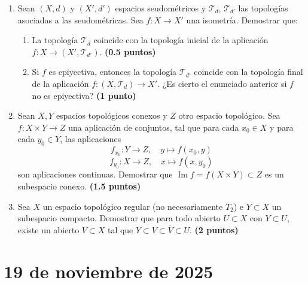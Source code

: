 \begin{enumerate}
    \item Sean $(X, d)$ y $(X', d')$ espacios seudométricos y $\mathcal{T}_d$, $\mathcal{T}_{d'}$ las topologías asociadas a las seudométricas. Sea $f : X \to X'$ una isometría. Demostrar que:
    \begin{enumerate}
        \item La topología $\mathcal{T}_d$ coincide con la topología inicial de la aplicación $f : X \to (X', \mathcal{T}_{d'})$.
        \hfill \textbf{(0.5 puntos)}
        
        \item Si $f$ es epiyectiva, entonces la topología $\mathcal{T}_{d'}$ coincide con la topología final de la aplicación $f : (X, \mathcal{T}_d) \to X'$. ¿Es cierto el enunciado anterior si $f$ no es epiyectiva?
        \hfill \textbf{(1 punto)}
    \end{enumerate}

    \item Sean $X, Y$ espacios topológicos conexos y $Z$ otro espacio topológico. Sea $f : X \times Y \to Z$ una aplicación de conjuntos, tal que para cada $x_0 \in X$ y para cada $y_0 \in Y$, las aplicaciones
    \[
        f_{x_0} : Y \to Z, \quad y \mapsto f(x_0, y)
    \]
    \[
        f_{y_0} : X \to Z, \quad x \mapsto f(x, y_0)
    \]
    son aplicaciones continuas. Demostrar que $\operatorname{Im} f = f(X \times Y) \subset Z$ es un subespacio conexo.
    \hfill \textbf{(1.5 puntos)}

    \item Sea $X$ un espacio topológico regular (no necesariamente $T_2$) e $Y \subset X$ un subespacio compacto. Demostrar que para todo abierto $U \subset X$ con $Y \subset U$, existe un abierto $V \subset X$ tal que $Y \subset V \subset \overline{V} \subset U$.
    \hfill \textbf{(2 puntos)}
\end{enumerate}

\newpage

\section{19 de noviembre de 2025}

